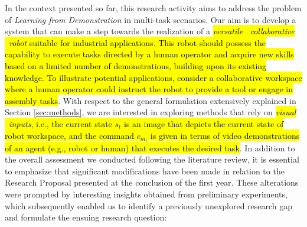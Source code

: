 In the context presented so far, this research activity aims to address the problem of \textit{Learning from Demonstration} in multi-task scenarios. Our aim is to develop a system that can make a step towards the realization of a \hl{\textit{versatile \ collaborative \ robot} suitable for industrial applications. This robot should possess the capability to execute tasks directed by a human operator and acquire new skills based on a limited number of demonstrations, building upon its existing knowledge. To illustrate potential applications, consider a collaborative workspace where a human operator could instruct the robot to provide a tool or engage in assembly tasks}.
\newline With respect to the general formulation extensively explained in Section \ref{sec:methods}, we are interested in exploring methods that rely on \hl{\textit{visual \ inputs}, i.e., the current state $s_{t}$ is an image that depicts the current state of robot workspace, and the command $c_{m_{i}}$ is given in terms of video demonstrations of an agent (e.g., robot or human) that executes the desired task}.
\newline In addition to the overall assessment we conducted following the literature review, it is essential to emphasize that significant modifications have been made in relation to the Research Proposal presented at the conclusion of the first year. These alterations were prompted by interesting insights obtained from preliminary experiments, which subsequently enabled us to identify a previously unexplored research gap and formulate the ensuing research question:

